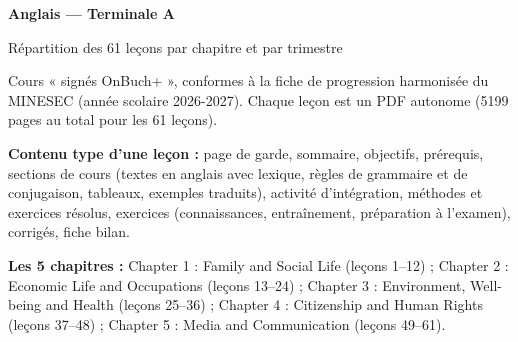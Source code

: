 \documentclass[11pt,a4paper]{article}
\begin{document}
{\LARGE\bfseries Anglais — Terminale A\par}\smallskip
{\large Répartition des 61 leçons par chapitre et par trimestre\par}\medskip
Cours « signés OnBuch+ », conformes à la fiche de progression harmonisée du MINESEC (année scolaire 2026-2027). Chaque leçon est un PDF autonome (5199 pages au total pour les 61 leçons).\par\medskip
\textbf{Contenu type d'une leçon :} page de garde, sommaire, objectifs, prérequis, sections de cours (textes en anglais avec lexique, règles de grammaire et de conjugaison, tableaux, exemples traduits), activité d'intégration, méthodes et exercices résolus, exercices (connaissances, entraînement, préparation à l'examen), corrigés, fiche bilan.\par\medskip
\textbf{Les 5 chapitres :} Chapter 1 : Family and Social Life (leçons 1--12) ; Chapter 2 : Economic Life and Occupations (leçons 13--24) ; Chapter 3 : Environment, Well-being and Health (leçons 25--36) ; Chapter 4 : Citizenship and Human Rights (leçons 37--48) ; Chapter 5 : Media and Communication (leçons 49--61).\par\bigskip
\end{document}
